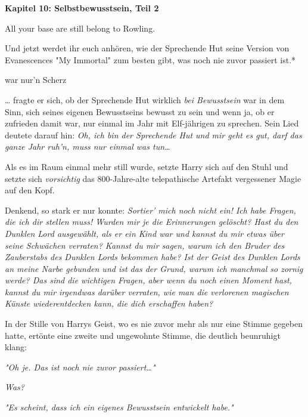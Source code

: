 

\hypertarget{selbstbewusstsein-teil-2}{%

\textbf{Kapitel 10: Selbstbewusstsein, Teil 2}

All your base are still belong to Rowling.

\later

Und jetzt werdet ihr euch anhören, wie der Sprechende Hut seine Version von Evanescences "My Immortal" zum besten gibt, was noch nie zuvor passiert ist.*

war nur'n Scherz

\later

… fragte er sich, ob der Sprechende Hut wirklich \emph{bei Bewusstsein} war in dem Sinn, sich seines eigenen Bewusstseins bewusst zu sein und wenn ja, ob er zufrieden damit war, nur einmal im Jahr mit Elf-jährigen zu sprechen. Sein Lied deutete darauf hin: \emph{Oh, ich bin der Sprechende Hut und mir geht es gut, darf das ganze Jahr ruh'n, muss nur einmal was tun…}

Als es im Raum einmal mehr still wurde, setzte Harry sich auf den Stuhl und setzte sich \emph{vorsichtig} das 800-Jahre-alte telepathische Artefakt vergessener Magie auf den Kopf.

Denkend, so stark er nur konnte: \emph{Sortier' mich noch nicht ein! Ich habe Fragen, die ich dir stellen muss! Wurden mir je die Erinnerungen gelöscht? Hast du den Dunklen Lord ausgewählt, als er ein Kind war und kannst du mir etwas über seine Schwächen verraten? Kannst du mir sagen, warum ich den Bruder des Zauberstabs des Dunklen Lords bekommen habe? Ist der Geist des Dunklen Lords an meine Narbe gebunden und ist das der Grund, warum ich manchmal so zornig werde? Das sind die wichtigen Fragen, aber wenn du noch einen Moment hast, kannst du mir irgendwas darüber verraten, wie man die verlorenen magischen Künste wiederentdecken kann, die dich erschaffen haben?}

In der Stille von Harrys Geist, wo es nie zuvor mehr als nur eine Stimme gegeben hatte, ertönte eine zweite und ungewohnte Stimme, die deutlich beunruhigt klang:

\emph{"Oh je. Das ist noch nie zuvor passiert…"}

\emph{Was?}

\emph{"Es scheint, dass ich ein eigenes Bewusstsein entwickelt habe."}

}
